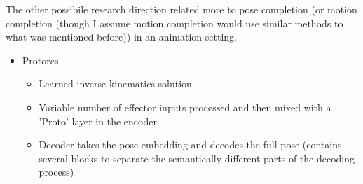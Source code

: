The other possibile research direction related more to pose completion (or motion completion (though I assume motion completion would use similar methods to what was mentioned before)) in an animation setting.

\begin{itemize}
    \item Protores \cite{protores}
    \begin{itemize}
        \item Learned inverse kinematics solution
        \item Variable number of effector inputs processed and then mixed with a 'Proto' layer in the encoder
        \item Decoder takes the pose embedding and decodes the full pose (contains several blocks to separate the semantically different parts of the decoding process)
    \end{itemize}
\end{itemize}